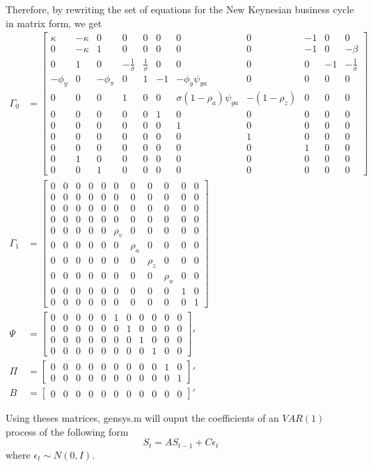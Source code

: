 \documentclass[12pt]{article}
\theoremstyle{definition}
\newcommand{\bra}[1]{\left[#1\right]}
\newcommand{\mat}[1]{\begin{matrix}#1\end{matrix}}
\newcommand{\bmat}[1]{\bra{\mat{#1}}}
\begin{document}
Therefore, by rewriting the set of equations for the New Keynesian business cycle in matrix form, we get
\begin{align*}
\Gamma_0 &= \bmat{\kappa& -\kappa & 0 & 0& 0 &0 &0 &0 &-1 &0 &0\\
	0& -\kappa & 1 & 0& 0 &0 &0 &0 &-1 &0 &-\beta\\
	0& 1& 0& -\frac{1}{\sigma}&  \frac{1}{\sigma} & 0& 0  &0 &0 &-1& -\frac{1}{\sigma}\\
	-\phi_y &0 & -\phi_{\pi} & 0& 1& -1& -\phi_y\psi_{ya} &0& 0& 0&0\\
	0 &0 &0 &1 &0& 0& \sigma(1-\rho_a)\psi_{ya}& -(1-\rho_z) &0 &0 &0\\
	0& 0 &0 &0 &0 &1 &0& 0& 0 &0& 0\\
	0& 0 &0 &0 &0 &0 &1 &0 &0 &0& 0\\
	0& 0 &0 &0 &0 &0 &0 &1 &0 &0& 0\\
	0& 0 &0 &0 &0 &0 &0 &0 &1 &0& 0\\
	0 &1 &0 &0 &0 &0 &0 &0 &0& 0& 0\\
	0 &0 &1 &0 &0 &0 &0 &0& 0& 0& 0}\\
\Gamma_1 &= \bmat{0& 0 &0 &0& 0& 0& 0& 0& 0& 0& 0\\
	0& 0 &0& 0& 0& 0& 0 &0& 0 &0& 0\\
	0& 0 &0& 0& 0& 0 &0 &0 &0& 0& 0\\
	0& 0 &0& 0& 0& 0 &0 &0 &0 &0& 0\\
	0& 0 &0& 0& 0& \rho_v& 0 &0& 0& 0& 0\\
	0& 0 &0& 0& 0& 0 &\rho_a& 0& 0& 0 &0\\
	0& 0 &0& 0& 0& 0& 0 &\rho_z& 0& 0 &0\\
	0& 0 &0& 0& 0& 0& 0 & 0 &\rho_u& 0 &0\\
	0& 0 &0& 0& 0& 0& 0& 0& 0 &1 &0\\
	0& 0 &0& 0& 0& 0 &0 &0& 0& 0& 1}\\
\Psi    &= \bmat{0& 0 &0& 0 &0 &1 &0& 0& 0& 0& 0\\
	0& 0 &0& 0& 0& 0& 1 &0& 0& 0& 0\\
	0& 0 &0& 0& 0& 0& 0& 1& 0& 0& 0\\
	0& 0 &0& 0& 0& 0& 0& 0& 1& 0& 0}'\\
\Pi     &= \bmat{0& 0& 0& 0 &0 &0& 0& 0& 0& 1& 0\\
	0& 0& 0& 0& 0& 0& 0& 0& 0& 0& 1}'\\
B   &= \bmat{0& 0& 0& 0& 0& 0& 0& 0& 0& 0& 0}'
\end{align*}

Using theses matrices, gensys.m will ouput the coefficients of an $VAR(1)$ process of the following form
\[
S_t = A S_{t-1} + C \epsilon_t
\]
where $\epsilon_t\sim N(0,I)$.
\end{document}
